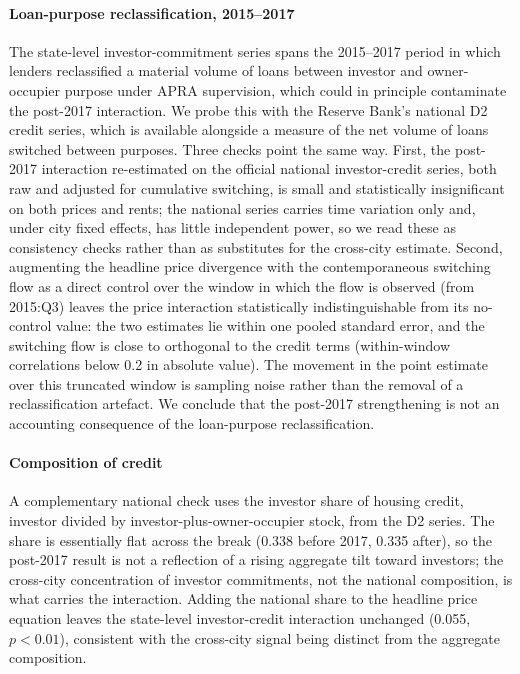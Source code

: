 \documentclass[preprint,11pt,authoryear]{elsarticle}
\begin{document}
\begin{appendices}
\paragraph{Loan-purpose reclassification, 2015--2017}
The state-level investor-commitment series spans the 2015--2017 period in which
lenders reclassified a material volume of loans between investor and
owner-occupier purpose under APRA supervision, which could in principle
contaminate the post-2017 interaction. We probe this with the Reserve Bank's
national D2 credit series, which is available alongside a measure of the net
volume of loans switched between purposes. Three checks point the same way.
First, the post-2017 interaction re-estimated on the official national
investor-credit series, both raw and adjusted for cumulative switching, is small
and statistically insignificant on both prices and rents; the national series
carries time variation only and, under city fixed effects, has little
independent power, so we read these as consistency checks rather than as
substitutes for the cross-city estimate. Second, augmenting the headline price
divergence with the contemporaneous switching flow as a direct control over the
window in which the flow is observed (from 2015:Q3) leaves the price interaction
statistically indistinguishable from its no-control value: the two estimates lie
within one pooled standard error, and the switching flow is close to orthogonal
to the credit terms (within-window correlations below 0.2 in absolute value).
The movement in the point estimate over this truncated window is sampling noise
rather than the removal of a reclassification artefact. We conclude that the
post-2017 strengthening is not an accounting consequence of the loan-purpose
reclassification.

\paragraph{Composition of credit}
A complementary national check uses the investor share of housing credit,
investor divided by investor-plus-owner-occupier stock, from the D2 series. The
share is essentially flat across the break (0.338 before 2017, 0.335 after), so
the post-2017 result is not a reflection of a rising aggregate tilt toward
investors; the cross-city concentration of investor commitments, not the national
composition, is what carries the interaction. Adding the national share to the
headline price equation leaves the state-level investor-credit interaction
unchanged (0.055, $p<0.01$), consistent with the cross-city signal being distinct
from the aggregate composition.


\end{appendices}
\end{document}
